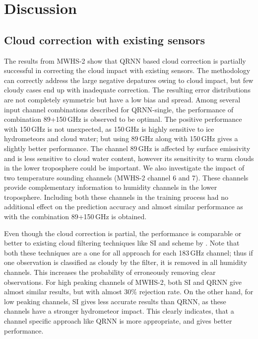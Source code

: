 \documentclass[amt, manuscript]{copernicus}
\begin{document}
\section{Discussion}
\label{discussions}

\subsection{Cloud correction with existing sensors}
%
The results from MWHS-2 show that QRNN based cloud correction is partially successful in correcting the cloud impact with existing sensors. The methodology can correctly address the large negative depatures owing to cloud impact, but few cloudy cases end up with inadequate correction. The resulting error distributions are not completely symmetric but have a low bias and spread. Among several input channel combinations described for QRNN-single, the performance of combination 89+150\,GHz is observed to be optimal. The positive performance with 150\,GHz is not unexpected, as 150\,GHz is highly sensitive to ice hydrometeors and cloud water; but using 89\,GHz along with 150\,GHz gives a slightly better performance. The channel 89\,GHz is affected by surface emissivity and is less sensitive to cloud water content, however its sensitivity to warm clouds in the lower troposphere could be important. We also investigate the impact of two temperature sounding channels (MWHS-2 channel 6 and 7). These channels provide complementary information to humidity channels in the lower troposphere. Including both these channels in the training process had no additional effect on the prediction accuracy and almost similar performance as with the combination 89+150\,GHz is obtained. 

Even though the cloud correction is partial, the performance is comparable or better to existing cloud filtering techniques like SI and scheme by \cite{buehler:aclou:07}. Note that both these techniques are a one for all approach for each 183\,GHz channel; thus if one observation is classified as cloudy by the filter, it is removed in all humidity channels. This increases the probability of erroneously removing clear observations. For high peaking channels of MWHS-2, both SI and QRNN give almost similar results, but with almost 30\% rejection rate. On the other hand, for low peaking channels, SI gives less accurate results than QRNN, as these channels have a stronger hydrometeor impact. This clearly indicates, that a channel specific approach like QRNN is more appropriate, and gives better performance. 
\end{document}
